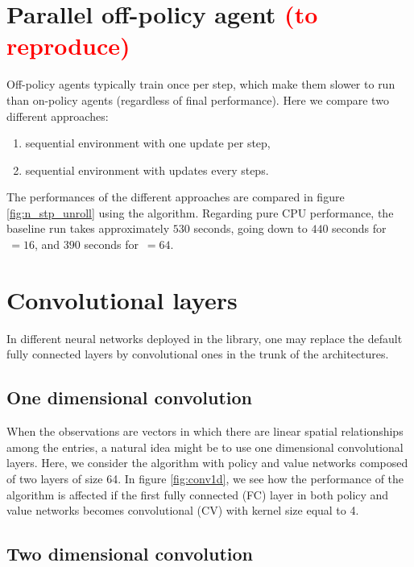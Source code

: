 \section{Parallel off-policy agent \textcolor{red}{(to reproduce)}}

Off-policy agents typically train once per step, which make them slower to run than on-policy agents (regardless of final performance). Here we  compare two different approaches:

\begin{enumerate}
	\item sequential environment with one update per step,
	\item sequential environment with  updates every  steps.
\end{enumerate}

The performances of the different approaches are compared in figure \ref{fig:n_stp_unroll} using the \tdt algorithm. Regarding pure CPU performance, the baseline run takes approximately $530$ seconds, going down to $440$ seconds for $\, = 16$, and $390$ seconds for $\, = 64$.



\section{Convolutional layers}
In different neural networks deployed in the library, one may replace the default fully connected layers by convolutional ones in the trunk of the architectures.
\subsection{One dimensional convolution}
When the observations are vectors in which there are linear spatial relationships among the entries, a natural idea might be to use one dimensional convolutional layers. Here, we consider the \ppo algorithm with policy and value networks composed of two layers of size 64. In figure \ref{fig:conv1d}, we see how the performance of the algorithm is affected if the first fully connected (FC) layer in both policy and value networks becomes convolutional (CV) with kernel size equal to 4. 



\subsection{Two dimensional convolution}
